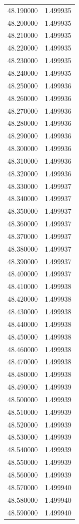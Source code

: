 \begin{tabular}{rr}
48.190000 & 1.499935 \\
48.200000 & 1.499935 \\
48.210000 & 1.499935 \\
48.220000 & 1.499935 \\
48.230000 & 1.499935 \\
48.240000 & 1.499935 \\
48.250000 & 1.499936 \\
48.260000 & 1.499936 \\
48.270000 & 1.499936 \\
48.280000 & 1.499936 \\
48.290000 & 1.499936 \\
48.300000 & 1.499936 \\
48.310000 & 1.499936 \\
48.320000 & 1.499936 \\
48.330000 & 1.499937 \\
48.340000 & 1.499937 \\
48.350000 & 1.499937 \\
48.360000 & 1.499937 \\
48.370000 & 1.499937 \\
48.380000 & 1.499937 \\
48.390000 & 1.499937 \\
48.400000 & 1.499937 \\
48.410000 & 1.499938 \\
48.420000 & 1.499938 \\
48.430000 & 1.499938 \\
48.440000 & 1.499938 \\
48.450000 & 1.499938 \\
48.460000 & 1.499938 \\
48.470000 & 1.499938 \\
48.480000 & 1.499938 \\
48.490000 & 1.499939 \\
48.500000 & 1.499939 \\
48.510000 & 1.499939 \\
48.520000 & 1.499939 \\
48.530000 & 1.499939 \\
48.540000 & 1.499939 \\
48.550000 & 1.499939 \\
48.560000 & 1.499939 \\
48.570000 & 1.499940 \\
48.580000 & 1.499940 \\
48.590000 & 1.499940 \\

\end{tabular}

